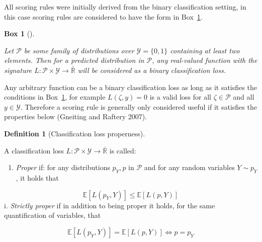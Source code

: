 \documentclass[
  letterpaper,
]{scrbook}
\providecommand{\tightlist}{%
  \setlength{\itemsep}{0pt}\setlength{\parskip}{0pt}}\usepackage{longtable,booktabs,array}
\theoremstyle{plain}
\newtheorem{conjecture}{Box}[chapter]
\theoremstyle{definition}
\newtheorem{definition}{Definition}[chapter]
\theoremstyle{remark}
\begin{document}
All scoring rules were initially derived from the binary classification
setting, in this case scoring rules are considered to have the form in
Box~\ref{cnj-loss-classif}.

\begin{tcolorbox}[enhanced jigsaw, titlerule=0mm, bottomrule=.15mm, left=2mm, leftrule=.75mm, rightrule=.15mm, colbacktitle=quarto-callout-note-color!10!white, bottomtitle=1mm, opacitybacktitle=0.6, title={Binary classification loss}, breakable, arc=.35mm, coltitle=black, toprule=.15mm, colframe=quarto-callout-note-color-frame, opacityback=0, toptitle=1mm, colback=white]

\leavevmode{}%
\begin{conjecture}[]\label{cnj-loss-classif}

Let \(\mathcal{P}\) be some family of distributions over
\(\mathcal{Y}= \{0,1\}\) containing at least two elements. Then for a
predicted distribution in \(\mathcal{P}\), any real-valued function with
the signature
\(L: \mathcal{P}\times \mathcal{Y}\rightarrow \bar{\mathbb{R}}\) will be
considered as a \emph{binary classification loss}.

\end{conjecture}

\end{tcolorbox}

Any arbitrary function can be a binary classification loss as long as it
satisfies the conditions in Box~\ref{cnj-loss-classif}, for example
\(L(\zeta, y) = 0\) is a valid loss for all \(\zeta \in \mathcal{P}\)
and all \(y \in \mathcal{Y}\). Therefore a scoring rule is generally
only considered useful if it satisfies the properties below (Gneiting
and Raftery 2007).

\leavevmode{}%
\begin{definition}[Classification loss
properness]\label{def-classif-proper}

A classification loss
\(L: \mathcal{P}\times \mathcal{Y}\rightarrow \bar{\mathbb{R}}\) is
called:

\begin{enumerate}
\def\labelenumi{\roman{enumi}.}
\tightlist
\item
  \emph{Proper} if: for any distributions \(p_Y,p\) in \(\mathcal{P}\)
  and for any random variables \(Y \sim p_Y\), it holds that
\end{enumerate}

\[
\mathbb{E}[L(p_Y, Y)] \leq \mathbb{E}[L(p, Y)]
\] i. \emph{Strictly proper} if in addition to being proper it holds,
for the same quantification of variables, that

\[
\mathbb{E}[L(p_Y, Y)] = \mathbb{E}[L(p, Y)] \Leftrightarrow p = p_Y
\]

\end{definition}
\end{document}
